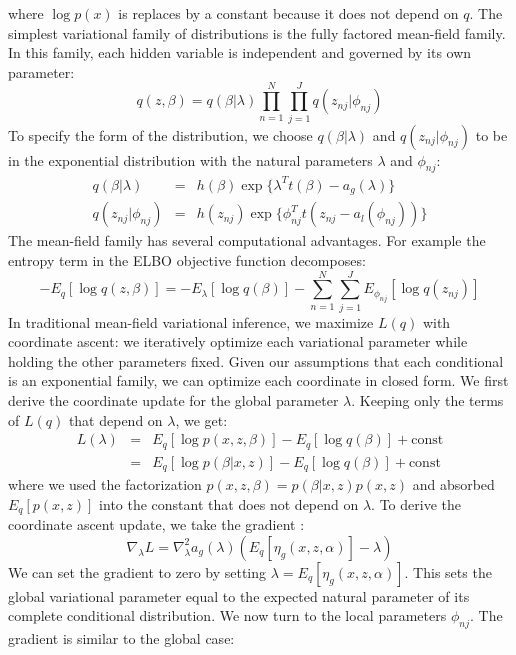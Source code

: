 where $\log p(x)$ is replaces by a constant because it does not depend on $q$. The simplest variational family of distributions is the fully factored mean-field family. In this family, each hidden variable is independent and governed by its own parameter:
\begin{equation}
    q(z,\beta) = q(\beta|\lambda)\prod_{n=1}^{N}\prod_{j=1}^{J}q(z_{nj}|\phi_{nj})
\end{equation}
To specify the form of the distribution, we choose $q(\beta|\lambda)$ and $q(z_{nj}|\phi_{nj})$ to be in the exponential distribution with the natural parameters $\lambda$ and $\phi_{nj}$:
\begin{eqnarray}
   q(\beta|\lambda) &=& h(\beta)\exp\{\lambda^{T}t(\beta) - a_{g}(\lambda)\}\\
   q(z_{nj}|\phi_{nj}) &=& h(z_{nj})\exp\{\phi_{nj}^{T}t(z_{nj} - a_{l}(\phi_{nj}))\}
\end{eqnarray}
The mean-field family has several computational advantages. For example the entropy term in the ELBO objective function decomposes:
\begin{equation}
   -E_q[\log q(z,\beta)] = -E_{\lambda}[\log q(\beta)] - \sum_{n=1}^{N}\sum_{j=1}^{J}E_{\phi_{nj}}[\log q(z_{nj})]
\end{equation}
In traditional mean-field variational inference, we maximize $L(q)$ with coordinate ascent: we iteratively optimize each variational parameter while holding the other parameters fixed. Given our assumptions that each conditional is an exponential family, we can optimize each coordinate in closed form. We first derive the coordinate update for the global parameter $\lambda$. Keeping only the terms of $L(q)$ that depend on $\lambda$, we get:
\begin{eqnarray}
    L(\lambda) &=& E_q[\log p(x,z,\beta)] - E_q[\log q(\beta)] + \mathrm{const} \\
    &=& E_q[\log p(\beta|x,z)] - E_q[\log q(\beta)] + \mathrm{const}
\end{eqnarray}
where we used the factorization $p(x,z,\beta) = p(\beta|x,z)p(x,z)$ and absorbed $E_q[p(x,z)]$ into the constant that does not depend on $\lambda$. To derive the coordinate ascent update, we take the gradient \cite{SVI2013}:
\begin{equation}
   \nabla_{\lambda}L = \nabla_{\lambda}^{2}a_g(\lambda)(E_q[\eta_g(x,z,\alpha)] - \lambda) 
\end{equation}
We can set the gradient to zero by setting $\lambda = E_q[\eta_g(x,z,\alpha)]$. This sets the global variational parameter equal to the expected natural parameter of its complete conditional distribution. We now turn to the local parameters $\phi_{nj}$. The gradient is similar to the global case:
